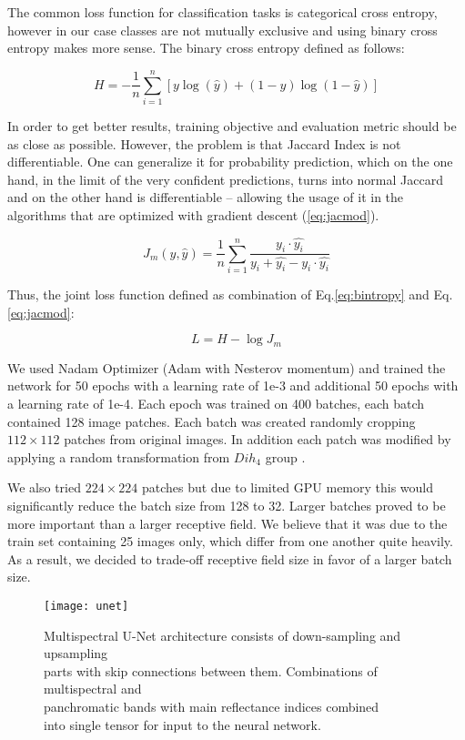 \documentclass[10pt,twocolumn,letterpaper]{article}
\begin{document}
The common loss function for classification tasks is categorical cross entropy, however in our case classes are not mutually exclusive and using binary cross entropy makes more sense. The binary cross entropy defined as follows:

\begin{equation} \label{eq:bintropy}
H = -\frac{1}{n}\sum_{i=1}^n{[y \log(\widehat{y})+(1-y)\log(1-\widehat{y})]}
\end{equation}

In order to get better results, training objective and evaluation metric should be as close as possible. However, the problem is that Jaccard Index is not differentiable. One can generalize it for probability prediction, which on the one hand, in the limit of the very confident predictions, turns into normal Jaccard and on the other hand is differentiable – allowing the usage of it in the algorithms that are optimized with gradient descent (\ref{eq:jacmod}).

\begin{equation} \label{eq:jacmod}
J_{m}(y, \widehat{y}) = \frac{1}{n} \sum_{i=1}^n \frac{y_i \cdot \widehat{y_i}}{y_i + \widehat{y_i} - y_i \cdot \widehat{y_i}}
\end{equation}

Thus, the joint loss function defined as combination of Eq.\ref{eq:bintropy} and Eq.\ref{eq:jacmod}:

\begin{equation}
L = H - \log J_{m}
\end{equation}

We used Nadam Optimizer (Adam with Nesterov momentum) \cite{nadam} and trained the network for 50 epochs with a learning rate of 1e-3 and additional 50 epochs with a learning rate of 1e-4. Each epoch was trained on 400 batches, each batch contained 128 image patches. Each batch was created randomly cropping $112 \times 112$ patches from original images. In addition each patch was modified by applying a random transformation from $Dih_4$ group \cite{D4}.

We also tried $224 \times 224$ patches but due to limited GPU memory this would significantly reduce the batch size from 128 to 32. Larger batches proved to be more important than a larger receptive field. We believe that it was due to the train set containing 25 images only, which differ from one another quite heavily. As a result, we decided to trade-off receptive field size in favor of a larger batch size.

\begin{figure*}[th]
	\centering
	\texttt{[image: unet]}
	\captionsetup{justification=centering}
	\caption{Multispectral U-Net architecture consists of down-sampling and upsampling \\ parts with skip connections between them.  Combinations of multispectral and \\ panchromatic bands with main reflectance indices combined \\ into single tensor for input to the neural network. }
	\label{fig:unet}
\end{figure*}
\end{document}
